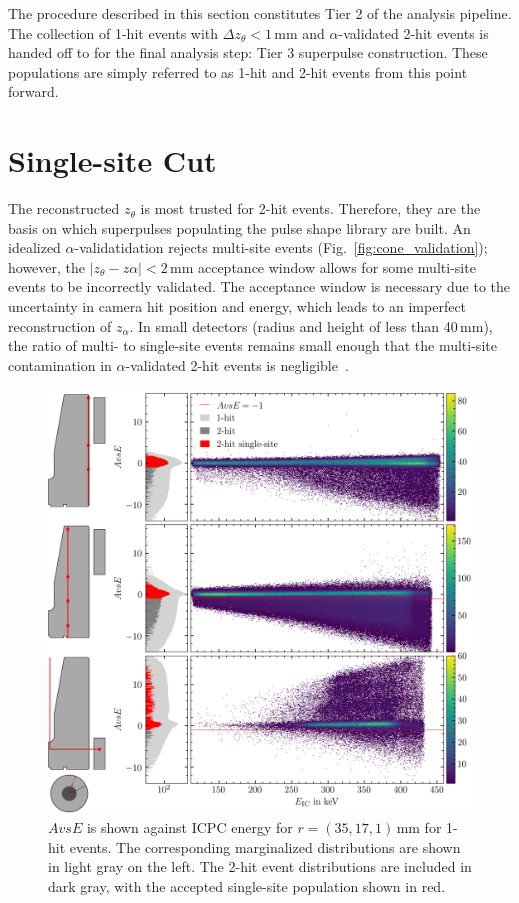 The procedure described in this section constitutes Tier 2 of the analysis pipeline. The collection of 1-hit events with $\Delta z_\theta < 1$\,mm and $\alpha$-validated 2-hit events is handed off to for the final analysis step: Tier 3 superpulse construction. These populations are simply referred to as 1-hit and 2-hit events from this point forward. 

\section{Single-site Cut}\label{subsec:singlesitecompton}

The reconstructed $z_\theta$ is most trusted for 2-hit events. Therefore, they are the basis on which superpulses populating the pulse shape library are built. An idealized $\alpha$-validatidation rejects multi-site events (Fig.~\ref{fig:cone_validation}); however, the $\left|z_\theta - z\alpha\right| < 2$\,mm acceptance window allows for some multi-site events to be incorrectly validated. The acceptance window is necessary due to the uncertainty in camera hit position and energy, which leads to an imperfect reconstruction of $z_\alpha$. In small detectors (radius and height of less than 40\,mm), the ratio of multi- to single-site events remains small enough that the multi-site contamination in $\alpha$-validated 2-hit events is negligible~\cite{compton_scanner}. 
\begin{figure}[H]
    \centering
    \includegraphics[width=6in]{figs/pipeline/avse_cut_compton.png}
    \caption{$AvsE$ is shown against ICPC energy for $r = (35,17,1)$\,mm for 1-hit events. The corresponding marginalized distributions are shown in light gray on the left. The 2-hit event distributions are included in dark gray, with the accepted single-site population shown in red.}
    \label{fig:avse_compton}
\end{figure}
